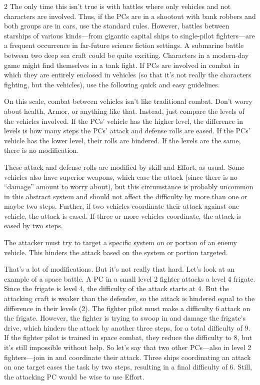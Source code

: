 \begin{multicols}{2}
The only time this isn’t true is with battles where only vehicles and not characters are involved. Thus, if the PCs are in a shootout with bank robbers and both groups are in cars, use the standard rules. However, battles between starships of various kinds—from gigantic capital ships to single-pilot fighters—are a frequent occurrence in far-future science fiction settings. A submarine battle between two deep sea craft could be quite exciting. Characters in a modern-day game might find themselves in a tank fight. If PCs are involved in combat in which they are entirely enclosed in vehicles (so that it’s not really the characters fighting, but the vehicles), use the following quick and easy guidelines.

On this scale, combat between vehicles isn’t like traditional combat. Don’t worry about health, Armor, or anything like that. Instead, just compare the levels of the vehicles involved. If the PCs’ vehicle has the higher level, the difference in levels is how many steps the PCs’ attack and defense rolls are eased. If the PCs’ vehicle has the lower level, their rolls are hindered. If the levels are the same, there is no modification.

These attack and defense rolls are modified by skill and Effort, as usual. Some vehicles also have superior weapons, which ease the attack (since there is no “damage” amount to worry about), but this circumstance is probably uncommon in this abstract system and should not affect the difficulty by more than one or maybe two steps. Further, if two vehicles coordinate their attack against one vehicle, the attack is eased. If three or more vehicles coordinate, the attack is eased by two steps.

The attacker must try to target a specific system on or portion of an enemy vehicle. This hinders the attack based on the system or portion targeted.

That’s a lot of modifications. But it’s not really that hard. Let’s look at an example of a space battle. A PC in a small level 2 fighter attacks a level 4 frigate. Since the frigate is level 4, the difficulty of the attack starts at 4. But the attacking craft is weaker than the defender, so the attack is hindered equal to the difference in their levels (2). The fighter pilot must make a difficulty 6 attack on the frigate. However, the fighter is trying to swoop in and damage the frigate’s drive, which hinders the attack by another three steps, for a total difficulty of 9. If the fighter pilot is trained in space combat, they reduce the difficulty to 8, but it’s still impossible without help. So let’s say that two other PCs—also in level 2 fighters—join in and coordinate their attack. Three ships coordinating an attack on one target eases the task by two steps, resulting in a final difficulty of 6. Still, the attacking PC would be wise to use Effort.


\end{multicols}
